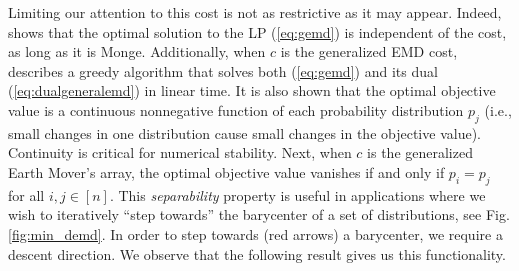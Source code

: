 

\begin{remark}Limiting our attention to this cost is not as restrictive as it may appear. 
Indeed, \cite{BEIN199597} shows that the optimal solution to the LP (\ref{eq:gemd}) is independent of the cost, as long as it is Monge.
Additionally, when $c$ is the generalized EMD cost, \cite{kline2019properties} describes a greedy algorithm that solves both (\ref{eq:gemd}) and its dual (\ref{eq:dualgeneralemd}) in linear time. 
It is also shown that the optimal objective value is a continuous nonnegative function of each probability distribution $p_j$ (i.e., small changes in one distribution cause small changes in the objective value). Continuity is critical for numerical stability.  Next, when $c$ is the generalized Earth Mover's array, the optimal objective value vanishes if and only if $p_i=p_j$ for all $i,j\in[n]$. 
This {\em separability} property is useful in applications where we wish to iteratively ``step towards'' the barycenter of a set of distributions, {\color{blue}see Fig. \ref{fig:min_demd}}.
In order to step towards {\color{blue}(red arrows)} a barycenter, we  require a descent direction.  %
We observe that the following  result gives us  this functionality.
\end{remark}

